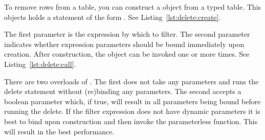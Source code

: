 To remove rows from a table, you can construct a  object from a typed table. This objects holds a statement of the form \newline {}. See Listing~\ref{lst:delete:create}.



The first parameter is the expression by which to filter. The second parameter indicates whether expression parameters should be bound immediately upon creation. After construction, the object can be invoked one or more times. See Listing~\ref{lst:delete:call}.



There are two overloads of . The first does not take any parameters and runs the delete statement without (re)binding any parameters. The second accepts a boolean parameter which, if true, will result in all parameters being bound before running the delete. If the filter expression does not have dynamic parameters it is best to bind upon construction and then invoke the parameterless function. This will result in the best performance.